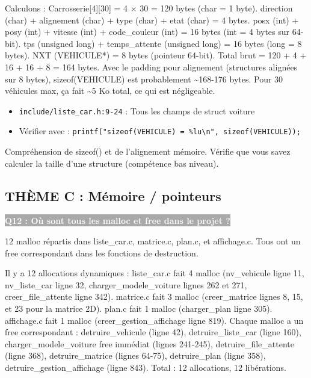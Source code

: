 \documentclass[12pt,a4paper]{article}
\newcommand{\question}[1]{%
    \vspace{0.5cm}
    \noindent\colorbox{darkgray}{\textcolor{white}{\textbf{#1}}}
    \vspace{0.3cm}
}
\begin{document}
\begin{reponse_longue}
Calculons : Carrosserie[4][30] = 4 × 30 = 120 bytes (char = 1 byte). direction (char) + alignement (char) + type (char) + etat (char) = 4 bytes. posx (int) + posy (int) + vitesse (int) + code\_couleur (int) = 16 bytes (int = 4 bytes sur 64-bit). tps (unsigned long) + temps\_attente (unsigned long) = 16 bytes (long = 8 bytes). NXT (VEHICULE*) = 8 bytes (pointeur 64-bit). Total brut = 120 + 4 + 16 + 16 + 8 = 164 bytes. Avec le padding pour alignement (structures alignées sur 8 bytes), sizeof(VEHICULE) est probablement \textasciitilde{}168-176 bytes. Pour 30 véhicules max, ça fait \textasciitilde{}5 Ko total, ce qui est négligeable.
\end{reponse_longue}

\begin{reference_code}
\begin{itemize}
    \item \texttt{include/liste\_car.h:9-24} : Tous les champs de struct voiture
    \item Vérifier avec : \texttt{printf("sizeof(VEHICULE) = \%lu\textbackslash{}n", sizeof(VEHICULE));}
\end{itemize}
\end{reference_code}

\begin{objectif_prof}
Compréhension de sizeof() et de l'alignement mémoire. Vérifie que vous savez calculer la taille d'une structure (compétence bas niveau).
\end{objectif_prof}

\subsection{THÈME C : Mémoire / pointeurs}

\question{Q12 : Où sont tous les malloc et free dans le projet ?}

\begin{reponse_courte}
12 malloc répartis dans liste\_car.c, matrice.c, plan.c, et affichage.c. Tous ont un free correspondant dans les fonctions de destruction.
\end{reponse_courte}

\begin{reponse_longue}
Il y a 12 allocations dynamiques : liste\_car.c fait 4 malloc (nv\_vehicule ligne 11, nv\_liste\_car ligne 32, charger\_modele\_voiture lignes 262 et 271, creer\_file\_attente ligne 342). matrice.c fait 3 malloc (creer\_matrice lignes 8, 15, et 23 pour la matrice 2D). plan.c fait 1 malloc (charger\_plan ligne 305). affichage.c fait 1 malloc (creer\_gestion\_affichage ligne 819). Chaque malloc a un free correspondant : detruire\_vehicule (ligne 42), detruire\_liste\_car (ligne 160), charger\_modele\_voiture free immédiat (lignes 241-245), detruire\_file\_attente (ligne 368), detruire\_matrice (lignes 64-75), detruire\_plan (ligne 358), detruire\_gestion\_affichage (ligne 843). Total : 12 allocations, 12 libérations.
\end{reponse_longue}
\end{document}
